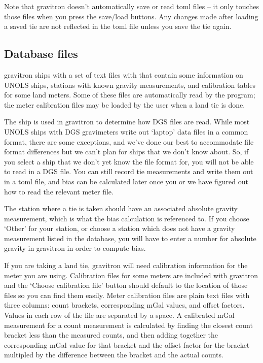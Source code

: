 \documentclass{pfpe-manual}
\begin{document}
Note that gravitron doesn't automatically save or read toml files -- it only touches those files when you press the save/load buttons. Any changes made after loading a saved tie are not reflected in the toml file unless you save the tie again.

\subsection{Database files}
\label{datab}
gravitron ships with a set of text files with that contain some information on UNOLS ships, stations with known gravity measurements, and calibration tables for some land meters. Some of these files are automatically read by the program; the meter calibration files may be loaded by the user when a land tie is done.

The ship is used in gravitron to determine how DGS files are read. While most UNOLS ships with DGS gravimeters write out `laptop' data files in a common format, there are some exceptions, and we've done our best to accommodate file format differences but we can't plan for ships that we don't know about. So, if you select a ship that we don't yet know the file format for, you will not be able to read in a DGS file. You can still record tie measurements and write them out in a toml file, and bias can be calculated later once you or we have figured out how to read the relevant meter file.

The station where a tie is taken should have an associated absolute gravity measurement, which is what the bias calculation is referenced to. If you choose `Other' for your station, or choose a station which does not have a gravity measurement listed in the database, you will have to enter a number for absolute gravity in gravitron in order to compute bias.

If you are taking a land tie, gravitron will need calibration information for the meter you are using. Calibration files for some meters are included with gravitron and the `Choose calibration file' button should default to the location of those files so you can find them easily. Meter calibration files are plain text files with three columns: count brackets, corresponding mGal values, and offset factors. Values in each row of the file are separated by a space. A calibrated mGal measurement for a count measurement is calculated by finding the closest count bracket less than the measured counts, and then adding together the corresponding mGal value for that bracket and the offset factor for the bracket multipled by the difference between the bracket and the actual counts.
\end{document}
